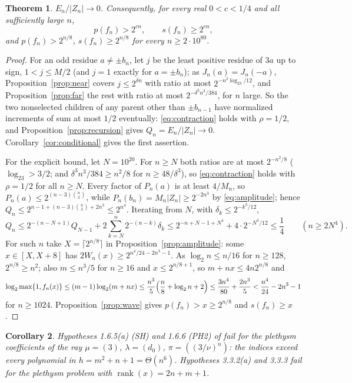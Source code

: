 \documentclass[11pt,a4paper]{article}
\newtheorem{theorem}{Theorem}[section]
\newtheorem{corollary}[theorem]{Corollary}
\theoremstyle{definition}
\newcommand{\rank}{\operatorname{rank}}
\begin{document}
\begin{theorem}\label{thm:indices}
$E_n/|Z_n|\to0$. Consequently, for every real $0<c<1/4$ and all sufficiently
large $n$,
\[
 p(f_n)>2^{cn},\qquad s(f_n)\ge2^{cn},
\]
and $p(f_n)>2^{n/8}$, $s(f_n)\ge2^{n/8}$ for every $n\ge2\cdot10^{80}$.
\end{theorem}

\begin{proof}
For an odd residue $a\ne\pm b_n$, let $j$ be the least positive residue of $3a$
up to sign, $1<j\le M/2$ (and $j=1$ exactly for $a=\pm b_n$); as
$J_n(a)=J_n(-a)$, Proposition~\ref{prop:near} covers $j\le2^{\delta n}$ with
ratio at most $2^{-n^2\log_23/12}$, and Proposition~\ref{prop:far} the rest with
ratio at most $2^{-\delta^3n^3/384}$, for $n$ large. So the two nonselected
children of any parent other than $\pm b_{n-1}$ have normalized increments of
sum at most $1/2$ eventually: \eqref{eq:contraction} holds with $\rho=1/2$, and
Proposition~\ref{prop:recursion} gives $Q_n=E_n/|Z_n|\to0$.
Corollary~\ref{cor:conditional} gives the first assertion.

For the explicit bound, let $N=10^{20}$. For $n\ge N$ both ratios are at most
$2^{-n^2/8}$ ($\log_23>3/2$; and $\delta^3n^3/384\ge n^2/8$ for
$n\ge48/\delta^3$), so \eqref{eq:contraction} holds with $\rho=1/2$ for all
$n\ge N$. Every factor of $P_n(a)$ is at least $4/M_n$, so
$P_n(a)\le2^{(n-3)\binom n3}$, while $P_n(b_n)=M_n|Z_n|\ge2^{-2n^3}$ by
\eqref{eq:amplitude}; hence $Q_n\le2^{n-1+(n-3)\binom n3+2n^3}\le2^{n^4}$.
Iterating from $N$, with $\delta_k\le2^{-k^3/12}$,
\[
 Q_n\le2^{-(n-N+1)}Q_{N-1}+2\sum_{k=N}^n2^{-(n-k)}\delta_k
 \le2^{-n+N-1+N^4}+4\cdot2^{-N^3/12}\le\frac14\qquad(n\ge2N^4).
\]
For such $n$ take $X=\lceil2^{n/8}\rceil$ in Proposition~\ref{prop:amplitude}:
some $x\in[X,X+8]$ has $2W_n(x)\ge2^{n^4/24-2n^3-1}$. As $\log_2n\le n/16$ for
$n\ge128$, $2^{n/8}\ge n^2$; also $m\le n^3/5$ for $n\ge16$ and $x\le2^{n/8+1}$,
so $m+nx\le4n2^{n/8}$ and
\[
 \log_2\max\{1,f_n(x)\}\le(m-1)\log_2(m+nx)\le\frac{n^3}5\Bigl(\frac n8+
 \log_2n+2\Bigr)\le\frac{3n^4}{80}+\frac{2n^3}5<\frac{n^4}{24}-2n^3-1
\]
for $n\ge1024$. Proposition~\ref{prop:wave} gives $p(f_n)>x\ge2^{n/8}$ and
$s(f_n)\ge x$.
\end{proof}

\begin{corollary}\label{cor:PH2SH}
Hypotheses 1.6.5(a) (SH) and 1.6.6 (PH2) of \cite{GCT6} fail for the plethysm
coefficients of the ray $\mu=(3)$, $\lambda=(d_0)$, $\pi=((3/\nu)^n)$: the
indices exceed every polynomial in $h=m^2+n+1=\Theta(n^6)$. Hypotheses
3.3.2(a) and 3.3.3 fail for the plethysm problem with $\rank(x)=2n+m+1$.
\end{corollary}
\end{document}
